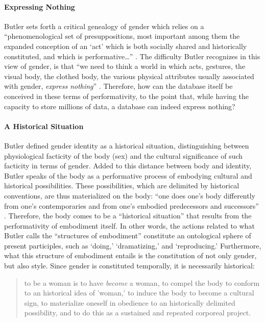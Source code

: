 \paragraph{Expressing Nothing}
Butler sets forth a critical genealogy of gender which relies on a ``phenomenological set of presuppositions, most important among them the expanded conception of an `act' which is both socially shared and historically constituted, and which is performative\dots'' \parencite[530]{But88:Per}. The difficulty Butler recognizes in this view of gender, is that ``we need to think a world in which acts, gestures, the visual body, the clothed body, the various physical attributes usually associated with gender, \textit{express nothing}'' \parencite[530]{But88:Per}. Therefore, how can the database itself be conceived in these terms of performativity, to the point that, while having the capacity to store millions of data, a database can indeed express nothing? 

\paragraph{A Historical Situation}
Butler defined gender identity as a historical situation, distinguishing between physiological facticity of the body (sex) and the cultural significance of such facticity in terms of gender. Added to this distance between body and identity, Butler speaks of the body as a performative process of embodying cultural and historical possibilities. These possibilities, which are delimited by historical conventions, are thus materialized on the body: ``one does one's body differently from one's contemporaries and from one's embodied predecessors and successors'' \parencite[521]{But88:Per}. Therefore, the body comes to be a ``historical situation'' that results from the performativity of embodiment itself. In other words, the actions related to what Butler calls the ``structures of embodiment'' constitute an ontological sphere of present participles, such as `doing,' `dramatizing,' and `reproducing.' Furthermore, what this structure of embodiment entails is the constitution of not only gender, but also style. Since gender is constituted temporally, it is necessarily historical:

\begin{quote}
	to be a woman is to have \textit{become} a woman, to compel the body to conform to an historical idea of 'woman,' to induce the body to become a cultural sign, to materialize oneself in obedience to an historically delimited possibility, and to do this as a sustained and repeated corporeal project. \parencite[521]{But88:Per}
\end{quote}

